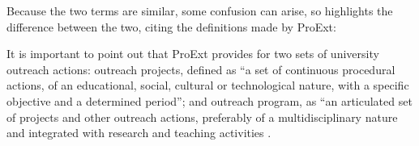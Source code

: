 

Because the two terms are similar, some confusion can arise, so  highlights the difference between the two, citing the definitions made by \ac{ProExt}:


\begin{citacao}
It is important to point out that ProExt provides for two sets of university outreach actions: outreach projects, defined as “a set of continuous procedural actions, of an educational, social, cultural or technological nature, with a specific objective and a determined period”; and outreach program, as “an articulated set of projects and other outreach actions, preferably of a multidisciplinary nature and integrated with research and teaching activities \cite{Viero}.
\end{citacao}

